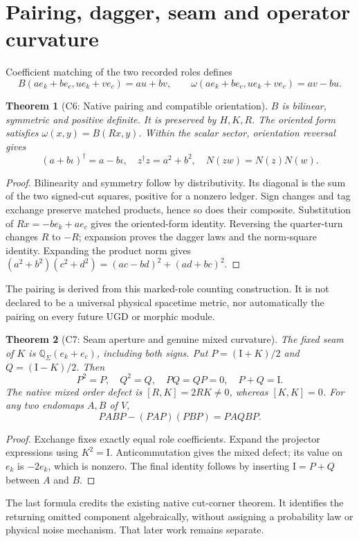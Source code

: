 \documentclass[11pt]{article}
\newtheorem{theorem}{Theorem}[section]
\newcommand{\Qcut}{\mathbb Q_\Sigma}
\newcommand{\Id}{\mathrm I}
\begin{document}
\section{Pairing, dagger, seam and operator curvature}
\label{sec:pairing}
Coefficient matching of the two recorded roles defines
\[
B(ae_k+be_c,ue_k+ve_c)=au+bv,\qquad
\omega(ae_k+be_c,ue_k+ve_c)=av-bu.
\]
\begin{theorem}[C6: Native pairing and compatible orientation]
\label{thm:pairing}
$B$ is bilinear, symmetric and positive definite. It is preserved by $H,K,R$.
The oriented form satisfies $\omega(x,y)=B(Rx,y)$. Within the scalar sector,
orientation reversal gives
\[
(a+b\iota)^\dagger=a-b\iota,\quad
z^\dagger z=a^2+b^2,\quad
N(zw)=N(z)N(w).
\]
\end{theorem}
\begin{proof}
Bilinearity and symmetry follow by distributivity. Its diagonal is the sum
of the two signed-cut squares, positive for a nonzero ledger. Sign changes
and tag exchange preserve matched products, hence so does their composite.
Substitution of $Rx=-be_k+ae_c$ gives the oriented-form identity. Reversing
the quarter-turn changes $R$ to $-R$; expansion proves the dagger laws and
the norm-square identity. Expanding the product norm gives
$(a^2+b^2)(c^2+d^2)=(ac-bd)^2+(ad+bc)^2$.
\end{proof}
The pairing is derived from this marked-role counting construction. It is
not declared to be a universal physical spacetime metric, nor automatically
the pairing on every future UGD or morphic module.

\begin{theorem}[C7: Seam aperture and genuine mixed curvature]
\label{thm:seam}
The fixed seam of $K$ is $\Qcut(e_k+e_c)$, including both signs. Put
$P=(\Id+K)/2$ and $Q=(\Id-K)/2$. Then
\[
P^2=P,\quad Q^2=Q,\quad PQ=QP=0,\quad P+Q=\Id.
\]
The native mixed order defect is $[R,K]=2RK\ne0$, whereas $[K,K]=0$.
For any two endomaps $A,B$ of $V$,
\[
PABP-(PAP)(PBP)=PAQBP.
\]
\end{theorem}
\begin{proof}
Exchange fixes exactly equal role coefficients. Expand the projector
expressions using $K^2=\Id$. Anticommutation gives the mixed defect; its
value on $e_k$ is $-2e_k$, which is nonzero. The final identity follows by
inserting $\Id=P+Q$ between $A$ and $B$.
\end{proof}
The last formula credits the existing native cut-corner theorem. It identifies
the returning omitted component algebraically, without assigning a probability
law or physical noise mechanism. That later work remains separate.
\end{document}

